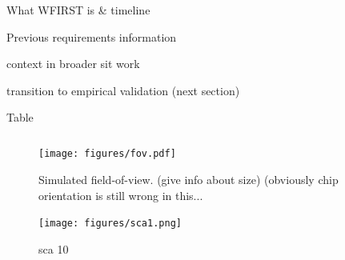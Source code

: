 \documentclass[aps,prd, amsmath,amssymb,superscriptaddress,showkeys,nofootinbib,reprint,preprintnumbers]{revtex4-1}
\begin{document}
What WFIRST is \& timeline

Previous requirements information

context in broader sit work

transition to empirical validation (next section)

\def\arraystretch{1.4}
\setlength{\tabcolsep}{4pt}
\begin{table}
\caption{Table}
\label{table:values}
\begin{center}
\begin{tabular}{lcccc }
\hline
\hline
\hline
\hline
\end{tabular}
\end{center}
\end{table}

\begin{figure}
\begin{center}
\texttt{[image: figures/fov.pdf]}
\end{center}
\caption[]{
Simulated field-of-view. (give info about size) (obviously chip orientation is still wrong in this...
\label{fig:fov}}
\end{figure}


\begin{figure}
\begin{center}
\texttt{[image: figures/sca1.png]}
\end{center}
\caption[]{
sca 10
\label{fig:sca}}
\end{figure}
\end{document}
